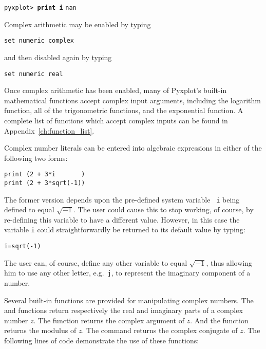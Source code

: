 \vspace{3mm}
\noindent\texttt{pyxplot> \textbf{print i}}\newline
\noindent\texttt{nan}
\vspace{3mm}

Complex arithmetic may be enabled by typing

\begin{verbatim}
set numeric complex
\end{verbatim}

\noindent and then disabled again by typing

\begin{verbatim}
set numeric real
\end{verbatim}

\noindent Once complex arithmetic has been enabled, many of Pyxplot's built-in
mathematical functions accept complex input arguments, including the logarithm
function, all of the trigonometric functions, and the exponential function.  A
complete list of functions which accept complex inputs can be found in
Appendix~\ref{ch:function_list}.

Complex number literals can be entered into algebraic expressions in either of
the following two forms:

\begin{verbatim}
print (2 + 3*i       )
print (2 + 3*sqrt(-1))
\end{verbatim}

\noindent The former version depends upon the pre-defined system variable {\tt
i} being defined to equal $\sqrt{-1}$. The user could cause this to stop working,
of course, by re-defining this variable to have a different value.  However, in
this case the variable {\tt i} could straightforwardly be returned to its
default value by typing:

\begin{verbatim}
i=sqrt(-1)
\end{verbatim}

\noindent The user can, of course, define any other variable to equal
$\sqrt{-1}$, thus allowing him to use any other letter, e.g.\ {\tt j}, to
represent the imaginary component of a number.

Several built-in functions are provided for manipulating complex numbers. The
 and  functions return respectively the real and
imaginary parts of a complex number $z$. The  function returns
the complex argument of $z$. And the  function returns the
modulus of $z$.  The  command returns the complex
conjugate of $z$. The following lines of code demonstrate the use of these
functions:

